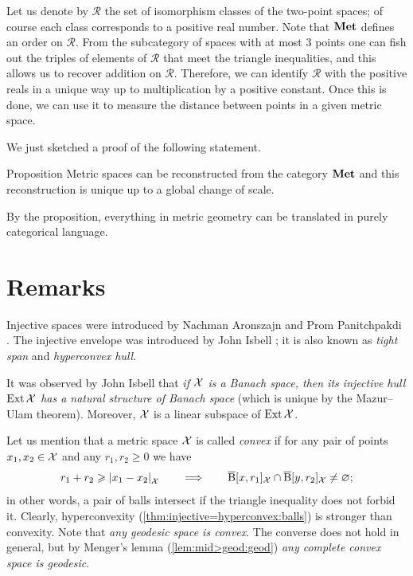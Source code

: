 Let us denote by $\mathscr{R}$ the set of isomorphism classes of the two-point spaces;
of course each class corresponds to a positive real number.
Note that $\mathbf{Met}$ defines an order on $\mathscr{R}$.
From the subcategory of spaces with at most 3 points one can fish out the triples of elements of $\mathscr{R}$ that meet the triangle inequalities, and this allows us to recover addition on $\mathscr{R}$.
Therefore, we can identify $\mathscr{R}$ with the positive reals in a unique way up to multiplication by a positive constant.
Once this is done, we can use it to measure the distance between points in a given metric space.

We just sketched a proof of the following statement.

\begin{thm}{Proposition}
Metric spaces can be reconstructed from the category $\mathbf{Met}$ and this reconstruction is
unique up to a global change of scale.
\end{thm}

By the proposition, everything in metric geometry can be translated in purely categorical language.


\section{Remarks}

Injective spaces were introduced by Nachman Aronszajn and Prom Panitchpakdi \cite{aronszajn-panitchpakdi}.
The injective envelope was introduced by John Isbell \cite{isbell}; it is also known as \emph{tight span} and \emph{hyperconvex hull}.

It was observed by John Isbell \cite{isbell2} that \textit{if $\mathcal{X}$ is a Banach space, then its injective hull $\mathop{\rm Ext}\nolimits\mathcal{X}$ has a natural structure of Banach space} (which is unique by the Mazur--Ulam theorem).
Moreover, $\mathcal{X}$ is a linear subspace of $\mathop{\rm Ext}\nolimits\mathcal{X}$.
 
Let us mention that a metric space $\mathcal{X}$ is called \emph{convex} if for any pair of points $x_1,x_2\in \mathcal{X}$ and any $r_1,r_2\ge 0$ we have 
\[r_1+r_2\ge \dist{x_1}{x_2}{\spc{X}}\qquad\Longrightarrow\qquad\cBall[x,r_1]_\spc{X}\cap \cBall[y,r_2]_\spc{X}\ne\emptyset;\]
in other words, a pair of balls intersect if the triangle inequality does not forbid it.
Clearly, hyperconvexity (\ref{thm:injective=hyperconvex:balls}) is stronger than convexity.
Note that \textit{any geodesic space is convex}.
The converse does not hold in general, but by Menger's lemma (\ref{lem:mid>geod:geod}) \textit{any complete convex space is geodesic}.

